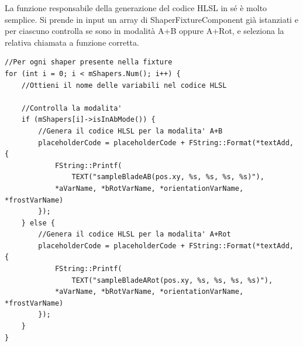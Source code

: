 \documentclass[main.tex]{subfiles}
\begin{document}
La funzione responsabile della generazione del codice HLSL in sé è molto semplice. Si prende in input un array di ShaperFixtureComponent già istanziati e per ciascuno controlla se sono in modalità A+B oppure A+Rot, e seleziona la relativa chiamata a funzione corretta.
\begin{lstlisting}
//Per ogni shaper presente nella fixture
for (int i = 0; i < mShapers.Num(); i++) {
    //Ottieni il nome delle variabili nel codice HLSL

    //Controlla la modalita'
    if (mShapers[i]->isInAbMode()) {
        //Genera il codice HLSL per la modalita' A+B
        placeholderCode = placeholderCode + FString::Format(*textAdd, {
            FString::Printf(
                TEXT("sampleBladeAB(pos.xy, %s, %s, %s, %s)"),
            *aVarName, *bRotVarName, *orientationVarName, *frostVarName)
        });
    } else {
        //Genera il codice HLSL per la modalita' A+Rot
        placeholderCode = placeholderCode + FString::Format(*textAdd, {
            FString::Printf(
                TEXT("sampleBladeARot(pos.xy, %s, %s, %s, %s)"),
            *aVarName, *bRotVarName, *orientationVarName, *frostVarName)
        });
    }
}
\end{lstlisting}
\end{document}
